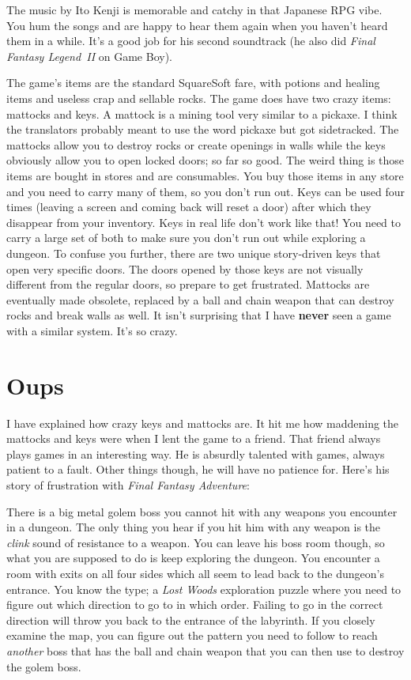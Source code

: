 \documentclass{book}
\begin{document}
The music by Ito Kenji is memorable and catchy in that Japanese RPG vibe. You hum the songs and are happy to hear them again when you haven’t heard them in a while. It’s a good job for his second soundtrack (he also did \emph{Final Fantasy Legend~II} on Game Boy).

The game’s items are the standard SquareSoft fare, with potions and healing items and useless crap and sellable rocks. The game does have two crazy items: mattocks and keys. A mattock is a mining tool very similar to a pickaxe. I think the translators probably meant to use the word pickaxe but got sidetracked. The mattocks allow you to destroy rocks or create openings in walls while the keys obviously allow you to open locked doors; so far so good. The weird thing is those items are bought in stores and are consumables. You buy those items in any store and you need to carry many of them, so you don’t run out. Keys can be used four times (leaving a screen and coming back will reset a door) after which they disappear from your inventory. Keys in real life don’t work like that! You need to carry a large set of both to make sure you don’t run out while exploring a dungeon. To confuse you further, there are two unique story-driven keys that open very specific doors. The doors opened by those keys are not visually different from the regular doors, so prepare to get frustrated. Mattocks are eventually made obsolete, replaced by a ball and chain weapon that can destroy rocks and break walls as well. It isn’t surprising that I have \textbf{never} seen a game with a similar system. It’s so crazy.

\FloatBarrier\needspace{10mm}\section*{Oups}\nopagebreak[4]

I have explained how crazy keys and mattocks are. It hit me how maddening the mattocks and keys were when I lent the game to a friend. That friend always plays games in an interesting way. He is absurdly talented with games, always patient to a fault. Other things though, he will have no patience for. Here’s his story of frustration with \emph{Final Fantasy Adventure}:

There is a big metal golem boss you cannot hit with any weapons you encounter in a dungeon. The only thing you hear if you hit him with any weapon is the \emph{clink} sound of resistance to a weapon. You can leave his boss room though, so what you are supposed to do is keep exploring the dungeon. You encounter a room with exits on all four sides which all seem to lead back to the dungeon’s entrance. You know the type; a \emph{Lost Woods} exploration puzzle where you need to figure out which direction to go to in which order. Failing to go in the correct direction will throw you back to the entrance of the labyrinth. If you closely examine the map, you can figure out the pattern you need to follow to reach \emph{another} boss that has the ball and chain weapon that you can then use to destroy the golem boss.
\end{document}
